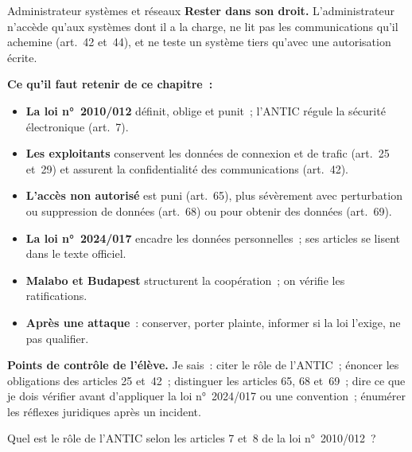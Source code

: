 \begin{boxmetier}{Administrateur systèmes et réseaux}
\textbf{Rester dans son droit.} L'administrateur n'accède qu'aux systèmes
dont il a la charge, ne lit pas les communications qu'il achemine
(art.~42 et~44), et ne teste un système tiers qu'avec une autorisation
écrite.
\end{boxmetier}

\separateur

\begin{boxresume}
\textbf{Ce qu'il faut retenir de ce chapitre~:}
\begin{itemize}
    \item \textbf{La loi n°~2010/012} définit, oblige et punit~; l'ANTIC
          régule la sécurité électronique (art.~7).
    \item \textbf{Les exploitants} conservent les données de connexion et de
          trafic (art.~25 et~29) et assurent la confidentialité des
          communications (art.~42).
    \item \textbf{L'accès non autorisé} est puni (art.~65), plus sévèrement
          avec perturbation ou suppression de données (art.~68) ou pour
          obtenir des données (art.~69).
    \item \textbf{La loi n°~2024/017} encadre les données personnelles~; ses
          articles se lisent dans le texte officiel.
    \item \textbf{Malabo et Budapest} structurent la coopération~; on
          vérifie les ratifications.
    \item \textbf{Après une attaque}~: conserver, porter plainte, informer
          si la loi l'exige, ne pas qualifier.
\end{itemize}
\end{boxresume}

\begin{boxinfo}
\textbf{Points de contrôle de l'élève.} Je sais~: citer le rôle de
l'ANTIC~; énoncer les obligations des articles 25 et~42~; distinguer les
articles 65, 68 et~69~; dire ce que je dois vérifier avant d'appliquer la
loi n°~2024/017 ou une convention~; énumérer les réflexes juridiques après
un incident.
\end{boxinfo}

\bigskip

\begin{boxexo}[title={\ding{45}\quad Exercice~11.1. Les institutions \niveaubase}]
Quel est le rôle de l'ANTIC selon les articles 7 et~8 de la loi
n°~2010/012~?
\end{boxexo}

